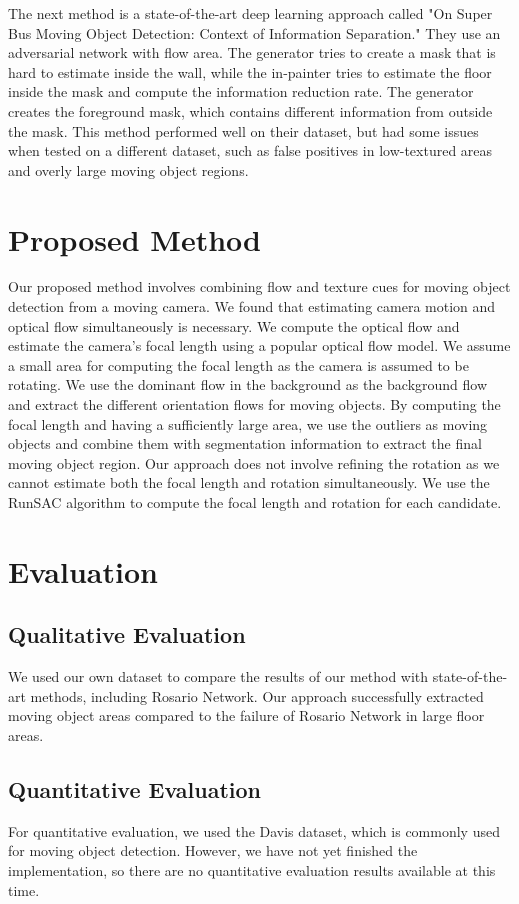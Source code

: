 \documentclass{article}
\begin{document}
\begin{multicols}{2}
The next method is a state-of-the-art deep learning approach called "On Super Bus Moving Object Detection: Context of Information Separation." They use an adversarial network with flow area. The generator tries to create a mask that is hard to estimate inside the wall, while the in-painter tries to estimate the floor inside the mask and compute the information reduction rate. The generator creates the foreground mask, which contains different information from outside the mask. This method performed well on their dataset, but had some issues when tested on a different dataset, such as false positives in low-textured areas and overly large moving object regions.

\section{Proposed Method}
Our proposed method involves combining flow and texture cues for moving object detection from a moving camera. We found that estimating camera motion and optical flow simultaneously is necessary. We compute the optical flow and estimate the camera's focal length using a popular optical flow model. We assume a small area for computing the focal length as the camera is assumed to be rotating. We use the dominant flow in the background as the background flow and extract the different orientation flows for moving objects. By computing the focal length and having a sufficiently large area, we use the outliers as moving objects and combine them with segmentation information to extract the final moving object region. Our approach does not involve refining the rotation as we cannot estimate both the focal length and rotation simultaneously. We use the RunSAC algorithm to compute the focal length and rotation for each candidate.

\section{Evaluation}

\subsection{Qualitative Evaluation}
We used our own dataset to compare the results of our method with state-of-the-art methods, including Rosario Network. Our approach successfully extracted moving object areas compared to the failure of Rosario Network in large floor areas.

\subsection{Quantitative Evaluation}
For quantitative evaluation, we used the Davis dataset, which is commonly used for moving object detection. However, we have not yet finished the implementation, so there are no quantitative evaluation results available at this time.


\end{multicols}
\end{document}
